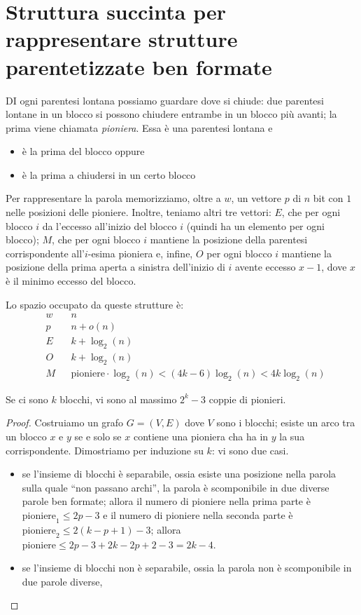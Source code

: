 \section{Struttura succinta per rappresentare strutture parentetizzate ben formate}

DI ogni parentesi lontana possiamo guardare dove si chiude: due parentesi lontane in un blocco
si possono chiudere entrambe in un blocco più avanti; la prima viene chiamata \textit{pioniera}.
Essa è una parentesi lontana e
\begin{itemize}
	\item è la prima del blocco oppure
	\item è la prima a chiudersi in un certo blocco
\end{itemize}
Per rappresentare la parola memorizziamo, oltre a $w$, un vettore $p$ di $n$ bit con $1$ nelle posizioni
delle pioniere. Inoltre, teniamo altri tre vettori: $E$, che per ogni blocco $i$ da l'eccesso all'inizio
del blocco $i$ (quindi ha un elemento per ogni blocco); $M$, che per ogni blocco $i$ mantiene la posizione
della parentesi corrispondente all'$i$-esima pioniera e, infine, $O$ per ogni blocco $i$ mantiene la
posizione della prima aperta a sinistra dell'inizio di $i$ avente eccesso $x-1$, dove $x$ è il
minimo eccesso del blocco.

Lo spazio occupato da queste strutture è:
$$
\begin{aligned}
	& w && n \\
	& p && n + o(n) \\
	& E && k + \log_2(n) \\
	& O && k + \log_2(n) \\
	& M && \text{pioniere} \cdot \log_2(n) < (4k - 6) \log_2(n) < 4k\log_2(n)
\end{aligned}
$$
\begin{theorem}
	Se ci sono $k$ blocchi, vi sono al massimo $2^k - 3$ coppie di pionieri.
\end{theorem}
\begin{proof}
	Costruiamo un grafo $G = (V, E)$ dove $V$ sono i blocchi; esiste un arco tra un blocco $x$ e $y$ se
	e solo se $x$ contiene una pioniera cha ha in $y$ la sua corrispondente.
	Dimostriamo per induzione su $k$: vi sono due casi.
	\begin{itemize}
		\item se l'insieme di blocchi è separabile, ossia esiste una posizione nella parola sulla quale
		      ``non passano archi'', la parola è scomponibile in due diverse parole ben formate;
		      allora il numero di pioniere nella prima parte è $\text{pioniere}_1 \leq 2p - 3$ e il
		      numero di pioniere nella seconda parte è $\text{pioniere}_2 \leq 2(k - p + 1) - 3$;
		      allora $\text{pioniere} \leq 2p - 3 + 2 k - 2p + 2 - 3 = 2k - 4$.
		\item se l'insieme di blocchi non è separabile, ossia la parola non è scomponibile in due
		      parole diverse,
	\end{itemize}
\end{proof}

